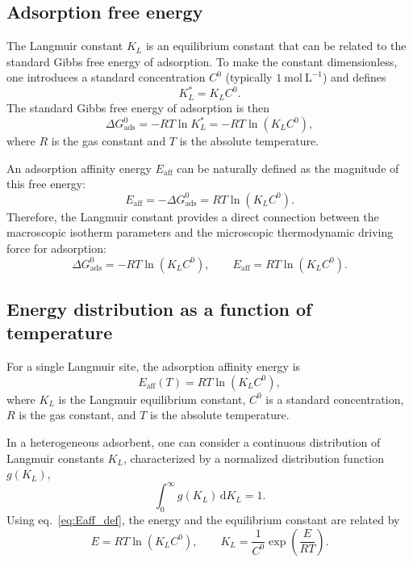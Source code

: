 	\subsection{Adsorption free energy}
	
	The Langmuir constant \(K_L\) is an equilibrium constant that can be
	related to the standard Gibbs free energy of adsorption. To make the
	constant dimensionless, one introduces a standard concentration
	\(C^0\) (typically \(1~\mathrm{mol~L^{-1}}\)) and defines
	\begin{equation}
		K_L^{\ast} = K_L C^0.
	\end{equation}
	The standard Gibbs free energy of adsorption is then
	\begin{equation}
		\Delta G_{\mathrm{ads}}^{0}
		= - R T \ln K_L^{\ast}
		= - R T \ln\left( K_L C^0 \right),
	\end{equation}
	where \(R\) is the gas constant and \(T\) is the absolute temperature.
	
	An adsorption affinity energy \(E_{\mathrm{aff}}\) can be naturally defined
	as the magnitude of this free energy:
	\begin{equation}
		E_{\mathrm{aff}} = - \Delta G_{\mathrm{ads}}^{0}
		= R T \ln\left( K_L C^0 \right).
	\end{equation}
	Therefore, the Langmuir constant provides a direct connection between
	the macroscopic isotherm parameters and the microscopic thermodynamic
	driving force for adsorption:
	\begin{equation}
		\boxed{\Delta G_{\mathrm{ads}}^{0}
			= - R T \ln\left( K_L C^0 \right),
			\qquad
			E_{\mathrm{aff}} = R T \ln\left( K_L C^0 \right).}
	\end{equation}
	
	\subsection{Energy distribution as a function of temperature}
	
	For a single Langmuir site, the adsorption affinity energy is
	\begin{equation}
		E_{\mathrm{aff}}(T)
		= R T \ln\!\left(K_L C^0\right),
		\label{eq:Eaff_def}
	\end{equation}
	where \(K_L\) is the Langmuir equilibrium constant, \(C^0\) is a standard
	concentration, \(R\) is the gas constant, and \(T\) is the absolute
	temperature.
	
	In a heterogeneous adsorbent, one can consider a continuous distribution of
	Langmuir constants \(K_L\), characterized by a normalized distribution
	function \(g(K_L)\),
	\begin{equation}
		\int_{0}^{\infty} g(K_L)\, \mathrm{d}K_L = 1.
	\end{equation}
	Using eq.~\eqref{eq:Eaff_def}, the energy and the equilibrium constant are
	related by
	\begin{equation}
		E = R T \ln\!\left(K_L C^0\right),
		\qquad
		K_L = \frac{1}{C^0} \exp\!\left(\frac{E}{R T}\right).
		\label{eq:K_of_E}
	\end{equation}
	
